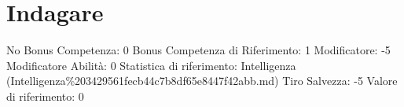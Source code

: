 \section{Indagare}\label{indagare}

\begin{description}
\tightlist
\item[Tags: ABI]
No Bonus Competenza: 0 Bonus Competenza di Riferimento: 1 Modificatore:
-5 Modificatore Abilità: 0 Statistica di riferimento: Intelligenza
(Intelligenza\%203429561fecb44c7b8df65e8447f42abb.md) Tiro Salvezza: -5
Valore di riferimento: 0
\end{description}
